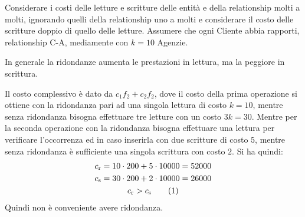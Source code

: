 \documentclass{article}
\numberwithin{equation}{subsection}
\newcommand{\tageq}{\tag{\stepcounter{equation}\theequation}}
\begin{document}
Considerare i costi delle letture e scritture delle entità e della relationship molti a molti, ignorando quelli della relationship uno a molti e 
considerare il costo delle scritture doppio di quello delle letture. Assumere che ogni Cliente abbia rapporti, relationship C-A, mediamente con $k=10$ Agenzie. 

In generale la ridondanze aumenta le prestazioni in lettura, ma la peggiore in scrittura. 

Il costo complessivo è dato da $c_1f_2+c_2f_2$, dove il costo della prima operazione si ottiene con la ridondanza pari ad una singola lettura di 
costo $k=10$, mentre senza ridondanza bisogna effettuare tre letture con un costo $3k=30$. 
Mentre per la seconda operazione con la ridondanza bisogna effettuare una lettura per verificare l'occorrenza ed in caso inserirla con due 
scritture di costo $5$, mentre senza ridondanza è sufficiente una singola scrittura con costo $2$. 
Si ha quindi:
\begin{gather*}
    c_{\mathrm{r}}=10\cdot200+5\cdot10000=52000\\
    c_{\mathrm{s}}=30\cdot200+2\cdot10000=26000\\
    c_{\mathrm{r}}>c_{\mathrm{s}}\tageq
\end{gather*}
Quindi non è conveniente avere ridondanza. 

\clearpage
\end{document}
